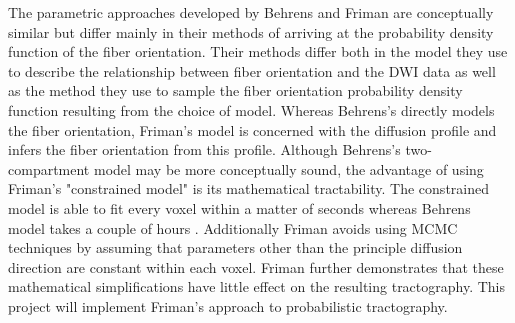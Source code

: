 The parametric approaches developed by Behrens and Friman are conceptually similar but differ mainly in their methods of arriving at the probability density function of the fiber orientation.  Their methods differ both in the model they use to describe the relationship between fiber orientation and the DWI data as well as the method they use to sample the fiber orientation probability density function resulting from the choice of model.  Whereas Behrens's directly models the fiber orientation, Friman's model is concerned with the diffusion profile and infers the fiber orientation from this profile.  Although Behrens's two-compartment model may be more conceptually sound, the advantage of using Friman's "constrained model" is its mathematical tractability.  The constrained model is able to fit every voxel within a matter of seconds whereas Behrens model takes a couple of hours \cite{frimanTMI06}.  Additionally Friman avoids using MCMC techniques by assuming that parameters other than the principle diffusion direction are constant within each voxel.  Friman further demonstrates that these mathematical simplifications have little effect on the resulting tractography.  This project will implement Friman's approach to probabilistic tractography.
